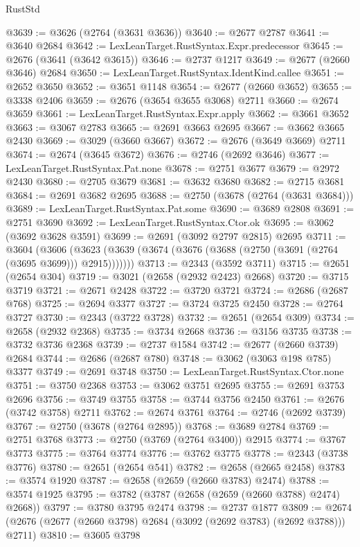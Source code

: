 \begin{lexlean}{RustStd}
\begin{coremodule}
{\begin{coremodule}
{{{{{{{{{{{{{{{{{{{{{{{{{{{{{{{{{{{{{{{{{{{{{{{{{{{{{{{@3639 := @3626 (@2764 (@3631 @3636))
@3640 := @2677 @2787
@3641 := @3640 @2684
@3642 := LexLeanTarget.RustSyntax.Expr.predecessor
@3645 := @2676 (@3641 (@3642 @3615))
@3646 := @2737 @1217
@3649 := @2677 (@2660 @3646) @2684
@3650 := LexLeanTarget.RustSyntax.IdentKind.callee
@3651 := @2652 @3650
@3652 := @3651 @1148
@3654 := @2677 (@2660 @3652)
@3655 := @3338 @2406
@3659 := @2676 (@3654 @3655 @3068) @2711
@3660 := @2674 @3659
@3661 := LexLeanTarget.RustSyntax.Expr.apply
@3662 := @3661 @3652
@3663 := @3067 @2783
@3665 := @2691 @3663 @2695
@3667 := @3662 @3665 @2430
@3669 := @3029 (@3660 @3667)
@3672 := @2676 (@3649 @3669) @2711
@3674 := @2674 (@3645 @3672)
@3676 := @2746 (@2692 @3646)
@3677 := LexLeanTarget.RustSyntax.Pat.none
@3678 := @2751 @3677
@3679 := @2972 @2430
@3680 := @2705 @3679
@3681 := @3632 @3680
@3682 := @2715 @3681
@3684 := @2691 @3682 @2695
@3688 := @2750 (@3678 (@2764 (@3631 @3684)))
@3689 := LexLeanTarget.RustSyntax.Pat.some
@3690 := @3689 @2808
@3691 := @2751 @3690
@3692 := LexLeanTarget.RustSyntax.Ctor.ok
@3695 := @3062 (@3692 @3628 @3591)
@3699 := @2691 (@3092 @2797 @2815) @2695
@3711 := @3604
    (@3606 (@3623 (@3639 (@3674 (@3676 (@3688 (@2750 (@3691 (@2764 (@3695 @3699))) @2915)))))))
@3713 := @2343 (@3592 @3711)
@3715 := @2651 (@2654 @304)
@3719 := @3021 (@2658 (@2932 @2423) @2668)
@3720 := @3715 @3719
@3721 := @2671 @2428
@3722 := @3720 @3721
@3724 := @2686 (@2687 @768)
@3725 := @2694 @3377
@3727 := @3724 @3725 @2450
@3728 := @2764 @3727
@3730 := @2343 (@3722 @3728)
@3732 := @2651 (@2654 @309)
@3734 := @2658 (@2932 @2368)
@3735 := @3734 @2668
@3736 := @3156 @3735
@3738 := @3732 @3736 @2368
@3739 := @2737 @1584
@3742 := @2677 (@2660 @3739) @2684
@3744 := @2686 (@2687 @780)
@3748 := @3062 (@3063 @198 @785) @3377
@3749 := @2691 @3748
@3750 := LexLeanTarget.RustSyntax.Ctor.none
@3751 := @3750 @2368
@3753 := @3062 @3751 @2695
@3755 := @2691 @3753 @2696
@3756 := @3749 @3755
@3758 := @3744 @3756 @2450
@3761 := @2676 (@3742 @3758) @2711
@3762 := @2674 @3761
@3764 := @2746 (@2692 @3739)
@3767 := @2750 (@3678 (@2764 @2895))
@3768 := @3689 @2784
@3769 := @2751 @3768
@3773 := @2750 (@3769 (@2764 @3400)) @2915
@3774 := @3767 @3773
@3775 := @3764 @3774
@3776 := @3762 @3775
@3778 := @2343 (@3738 @3776)
@3780 := @2651 (@2654 @541)
@3782 := @2658 (@2665 @2458)
@3783 := @3574 @1920
@3787 := @2658 (@2659 (@2660 @3783) @2474)
@3788 := @3574 @1925
@3795 := @3782 (@3787 (@2658 (@2659 (@2660 @3788) @2474) @2668))
@3797 := @3780 @3795 @2474
@3798 := @2737 @1877
@3809 := @2674 (@2676 (@2677 (@2660 @3798) @2684 (@3092 (@2692 @3783) (@2692 @3788))) @2711)
@3810 := @3605 @3798
}}}}}}}}}}}}}}}}}}}}}}}}}}}}}}}}}}}}}}}}}}}}}}}}}}}}}}}
\end{coremodule}}
\end{coremodule}
\end{lexlean}
